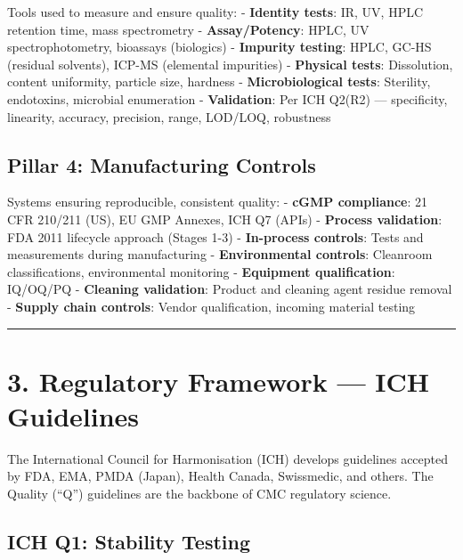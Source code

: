 \documentclass[
  11pt,
  a4paper,
]{report}
\begin{document}
Tools used to measure and ensure quality: - \textbf{Identity tests}: IR,
UV, HPLC retention time, mass spectrometry - \textbf{Assay/Potency}:
HPLC, UV spectrophotometry, bioassays (biologics) - \textbf{Impurity
testing}: HPLC, GC-HS (residual solvents), ICP-MS (elemental impurities)
- \textbf{Physical tests}: Dissolution, content uniformity, particle
size, hardness - \textbf{Microbiological tests}: Sterility, endotoxins,
microbial enumeration - \textbf{Validation}: Per ICH Q2(R2) ---
specificity, linearity, accuracy, precision, range, LOD/LOQ, robustness

\hypertarget{pillar-4-manufacturing-controls}{%
\subsection{Pillar 4: Manufacturing
Controls}\label{pillar-4-manufacturing-controls}}

Systems ensuring reproducible, consistent quality: - \textbf{cGMP
compliance}: 21 CFR 210/211 (US), EU GMP Annexes, ICH Q7 (APIs) -
\textbf{Process validation}: FDA 2011 lifecycle approach (Stages 1-3) -
\textbf{In-process controls}: Tests and measurements during
manufacturing - \textbf{Environmental controls}: Cleanroom
classifications, environmental monitoring - \textbf{Equipment
qualification}: IQ/OQ/PQ - \textbf{Cleaning validation}: Product and
cleaning agent residue removal - \textbf{Supply chain controls}: Vendor
qualification, incoming material testing

\begin{center}\rule{0.5\linewidth}{0.5pt}\end{center}

\hypertarget{regulatory-framework-ich-guidelines}{%
\section{3. Regulatory Framework --- ICH
Guidelines}\label{regulatory-framework-ich-guidelines}}

The International Council for Harmonisation (ICH) develops guidelines
accepted by FDA, EMA, PMDA (Japan), Health Canada, Swissmedic, and
others. The Quality (``Q'') guidelines are the backbone of CMC
regulatory science.

\hypertarget{ich-q1-stability-testing}{%
\subsection{ICH Q1: Stability Testing}\label{ich-q1-stability-testing}}
\end{document}
